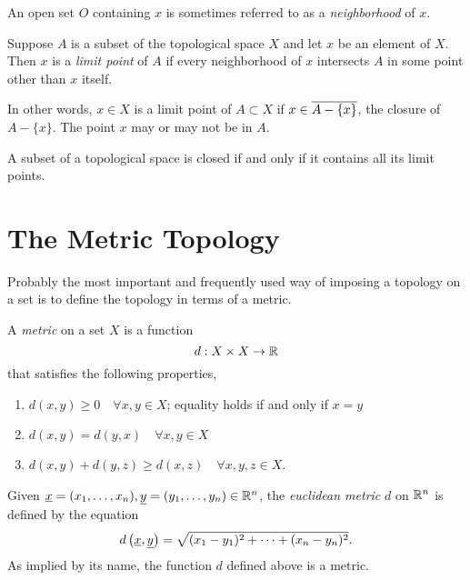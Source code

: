 An open set $O$ containing $x$ is sometimes referred to as a \emph{neighborhood} of $x$.

\begin{definition}
Suppose $A$ is a subset of the topological space $X$ and let $x$ be an element of $X$.
Then $x$ is a \emph{limit point} of $A$ if every neighborhood of $x$ intersects $A$ in some point other than $x$ itself.
\end{definition}

In other words, $x \in X$ is a limit point of $A \subset X$ if $x \in \overline{A - \{ x \}}$, the closure of $A - \{ x \}$.
The point $x$ may or may not be in $A$.

\begin{theorem}
A subset of a topological space is closed if and only if it contains all its limit points.
\end{theorem}


\section{The Metric Topology}

Probably the most important and frequently used way of imposing a topology on a set is to define the topology in terms of a metric.

\begin{definition}
A \emph{metric} on a set $X$ is a function
\begin{equation*}
d: X \times X \rightarrow \mathbb{R}
\end{equation*}
that satisfies the following properties,
\begin{enumerate}
\item $d(x,y) \geq 0 \quad \forall x, y \in X$; equality holds if and only if $x = y$
\item $d(x,y) = d(y,x) \quad \forall x, y \in X$
\item $d(x,y) + d(y,z) \geq d(x,z) \quad \forall x, y, z \in X$.
\end{enumerate}
\end{definition}

\begin{example}
Given $\underline{x} = (x_1, \ldots, x_n), \underline{y} = (y_1, \ldots, y_n) \in \mathbb{R}^n$, the \emph{euclidean metric} $d$ on $\mathbb{R}^n$ is defined by the equation
\begin{equation*}
d \left( \underline{x}, \underline{y} \right)
= \sqrt{ (x_1 - y_1)^2 + \cdots + (x_n - y_n)^2 }.
\end{equation*}
As implied by its name, the function $d$ defined above is a metric.
\end{example}

